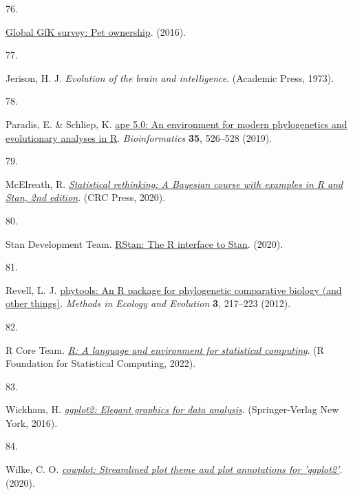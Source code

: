 \documentclass[
  man,floatsintext]{apa6}
\newlength{\cslhangindent}
\newlength{\csllabelwidth}
\newlength{\cslentryspacingunit} %
\newenvironment{CSLReferences}[2] %
 {%
  \setlength{\parindent}{0pt}
  \ifodd #1
  \let\oldpar\par
  \def\par{\hangindent=\cslhangindent\oldpar}
  \fi
  \setlength{\parskip}{#2\cslentryspacingunit}
 }%
 {}
\newcommand{\CSLLeftMargin}[1]{\parbox[t]{\csllabelwidth}{#1}}
\newcommand{\CSLRightInline}[1]{\parbox[t]{\linewidth - \csllabelwidth}{#1}\break}
\begin{document}
\begin{CSLReferences}{0}{0}
\leavevmode{}%
\CSLLeftMargin{76. }%
\CSLRightInline{\href{http://www.gfk.com/global-studies/global-studies-pet-ownership}{Global GfK survey: Pet ownership}. (2016).}

\leavevmode{}%
\CSLLeftMargin{77. }%
\CSLRightInline{Jerison, H. J. \emph{Evolution of the brain and intelligence}. (Academic Press, 1973).}

\leavevmode{}%
\CSLLeftMargin{78. }%
\CSLRightInline{Paradis, E. \& Schliep, K. \href{https://doi.org/10.1093/bioinformatics/bty633}{{ape} 5.0: An environment for modern phylogenetics and evolutionary analyses in {R}}. \emph{Bioinformatics} \textbf{35}, 526--528 (2019).}

\leavevmode{}%
\CSLLeftMargin{79. }%
\CSLRightInline{McElreath, R. \emph{\href{http://xcelab.net/rm/statistical-rethinking/}{Statistical rethinking: A {Bayesian} course with examples in {R} and {Stan}, 2nd edition}}. (CRC Press, 2020).}

\leavevmode{}%
\CSLLeftMargin{80. }%
\CSLRightInline{Stan Development Team. \href{http://mc-stan.org/}{{RStan}: The {R} interface to {Stan}}. (2020).}

\leavevmode{}%
\CSLLeftMargin{81. }%
\CSLRightInline{Revell, L. J. \href{https://doi.org/10.1111/j.2041-210X.2011.00169.x}{{phytools}: An {R} package for phylogenetic comparative biology (and other things)}. \emph{Methods in Ecology and Evolution} \textbf{3}, 217--223 (2012).}

\leavevmode{}%
\CSLLeftMargin{82. }%
\CSLRightInline{R Core Team. \emph{\href{https://www.R-project.org/}{R: A language and environment for statistical computing}}. (R Foundation for Statistical Computing, 2022).}

\leavevmode{}%
\CSLLeftMargin{83. }%
\CSLRightInline{Wickham, H. \emph{\href{https://ggplot2.tidyverse.org}{{ggplot2}: Elegant graphics for data analysis}}. (Springer-Verlag New York, 2016).}

\leavevmode{}%
\CSLLeftMargin{84. }%
\CSLRightInline{Wilke, C. O. \emph{\href{https://CRAN.R-project.org/package=cowplot}{{cowplot}: Streamlined plot theme and plot annotations for 'ggplot2'}}. (2020).}


\end{CSLReferences}
\end{document}
